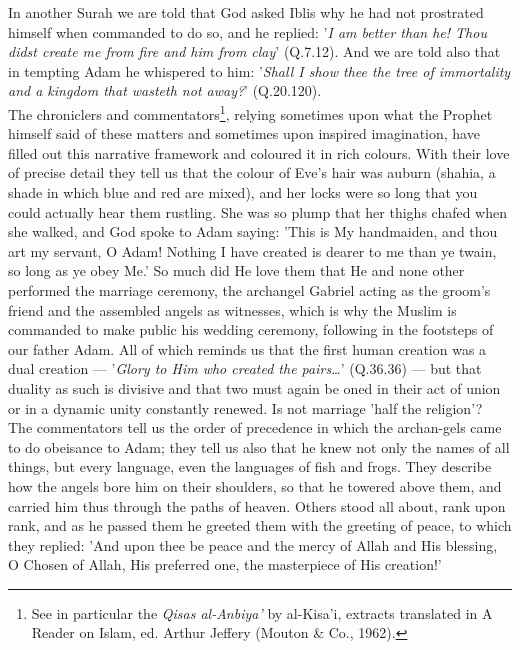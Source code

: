 \documentclass[10pt, twoside]{book}
\begin{document}
In another Surah we are told that God asked Iblis why he had not prostrated himself when commanded to 
do so, and he replied: '\emph{I am better than he! Thou didst create me from fire and him from clay}' 
(Q.7.12). And we are told also that in tempting Adam he whispered to him: '\emph{Shall I show thee the tree 
of immortality and a kingdom that wasteth not away?}' (Q.20.120). \\

The chroniclers and commentators\footnote{See in particular the \emph{Qisas al\hyp{}Anbiya'} by al\hyp{}Kisa'i, extracts translated in A Reader on Islam, ed. Arthur Jeffery (Mouton \& Co., 1962).}, relying sometimes upon what the Prophet himself said of these 
matters and sometimes upon inspired imagination, have filled out this narrative framework and 
coloured it in rich colours. With their love of precise detail they tell us that the colour of Eve's 
hair was auburn (shahia, a shade in which blue and red are mixed), and her locks were so long that 
you could actually hear them rustling. She was so plump that her thighs chafed when she walked, and 
God spoke to Adam saying: 'This is My handmaiden, and thou art my servant, O Adam! Nothing I have 
created is dearer to me than ye twain, so long as ye obey Me.' So much did He love them that He and 
none other performed the marriage ceremony, the archangel Gabriel acting as the groom's friend and 
the assembled angels as witnesses, which is why the Muslim is commanded to make public his wedding 
ceremony, following in the footsteps of our father Adam. All of which reminds us that the first human 
creation was a dual creation --- '\emph{Glory to Him who created the pairs\ldots{}}' (Q.36.36) --- but that duality 
as such is divisive and that two must again be oned in their act of union or in a dynamic unity 
constantly renewed. Is not marriage 'half the religion'? \\

The commentators tell us the order of precedence in which the archan\hyp{}gels came to do obeisance to 
Adam; they tell us also that he knew not only the names of all things, but every language, even the 
languages of fish and frogs. They describe how the angels bore him on their shoulders, so that he 
towered above them, and carried him thus through the paths of heaven. Others stood all about, rank 
upon rank, and as he passed them he greeted them with the greeting of peace, to which they replied: 
'And upon thee be peace and the mercy of Allah and His blessing, O Chosen of Allah, His preferred 
one, the masterpiece of His creation!' \\
\end{document}
